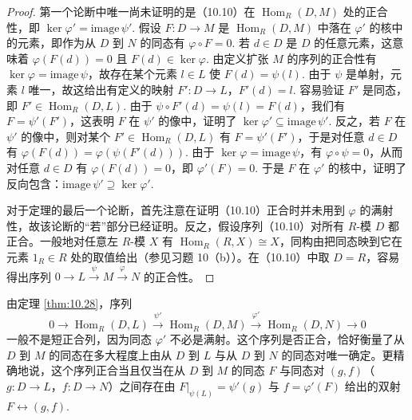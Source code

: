 \begin{proof}
第一个论断中唯一尚未证明的是（10.10）在 \(\operatorname{Hom}_R(D, M)\) 处的正合性，即 \(\ker\varphi' = \mathrm{image}\,\psi'\). 假设 \(F : D \to M\) 是 \(\operatorname{Hom}_R(D, M)\) 中落在 \(\varphi'\) 的核中的元素，即作为从 \(D\) 到 \(N\) 的同态有 \(\varphi \circ F = 0\). 若 \(d \in D\) 是 \(D\) 的任意元素，这意味着 \(\varphi(F(d)) = 0\) 且 \(F(d) \in \ker\varphi\). 由定义扩张 \(M\) 的序列的正合性有 \(\ker\varphi = \mathrm{image}\,\psi\)，故存在某个元素 \(l \in L\) 使 \(F(d) = \psi(l)\). 由于 \(\psi\) 是单射，元素 \(l\) 唯一，故这给出有定义的映射 \(F' : D \to L\)，\(F'(d) = l\). 容易验证 \(F'\) 是同态，即 \(F' \in \operatorname{Hom}_R(D, L)\). 由于 \(\psi \circ F'(d) = \psi(l) = F(d)\)，我们有 \(F = \psi'(F')\)，这表明 \(F\) 在 \(\psi'\) 的像中，证明了 \(\ker\varphi' \subseteq \mathrm{image}\,\psi'\). 反之，若 \(F\) 在 \(\psi'\) 的像中，则对某个 \(F' \in \operatorname{Hom}_R(D, L)\) 有 \(F = \psi'(F')\)，于是对任意 \(d \in D\) 有 \(\varphi(F(d)) = \varphi(\psi(F'(d)))\). 由于 \(\ker\varphi = \mathrm{image}\,\psi\)，有 \(\varphi \circ \psi = 0\)，从而对任意 \(d \in D\) 有 \(\varphi(F(d)) = 0\)，即 \(\varphi'(F) = 0\). 于是 \(F\) 在 \(\varphi'\) 的核中，证明了反向包含：\(\mathrm{image}\,\psi' \supseteq \ker\varphi'\).

对于定理的最后一个论断，首先注意在证明（10.10）正合时并未用到 \(\varphi\) 的满射性，故该论断的“若”部分已经证明。反之，假设序列（10.10）对所有 \(R\)-模 \(D\) 都正合。一般地对任意左 \(R\)-模 \(X\) 有 \(\operatorname{Hom}_R(R, X) \cong X\)，同构由把同态映到它在元素 \(1_R \in R\) 处的取值给出（参见习题 10（b））。在（10.10）中取 \(D = R\)，容易得出序列 \(0 \to L \xrightarrow{\psi} M \xrightarrow{\varphi} N\) 的正合性。
\end{proof}

由定理 \ref{thm:10.28}，序列
\begin{equation}
0 \longrightarrow \operatorname{Hom}_R(D, L) \xrightarrow{\ \psi'\ } \operatorname{Hom}_R(D, M) \xrightarrow{\ \varphi'\ } \operatorname{Hom}_R(D, N) \longrightarrow 0 \tag{10.11}
\end{equation}
一般不是短正合列，因为同态 \(\varphi'\) 不必是满射。这个序列是否正合，恰好衡量了从 \(D\) 到 \(M\) 的同态在多大程度上由从 \(D\) 到 \(L\) 与从 \(D\) 到 \(N\) 的同态对唯一确定。更精确地说，这个序列正合当且仅当在从 \(D\) 到 \(M\) 的同态 \(F\) 与同态对 \((g, f)\)（\(g : D \to L\)，\(f : D \to N\)）之间存在由 \(F|_{\psi(L)} = \psi'(g)\) 与 \(f = \varphi'(F)\) 给出的双射 \(F \leftrightarrow (g, f)\).

